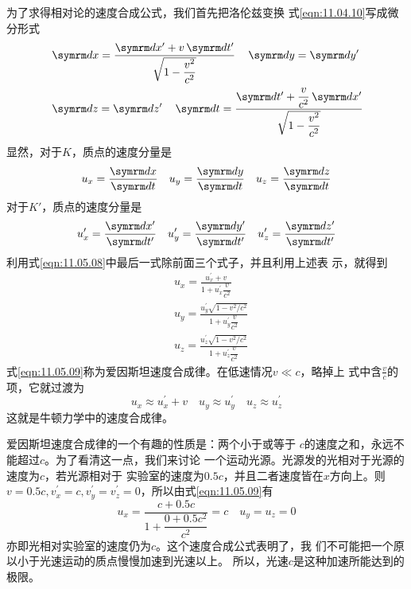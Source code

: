 为了求得相对论的速度合成公式，我们首先把洛伦兹变换
\lhbrak 式\eqref{eqn:11.04.10}\rhbrak 写成微分形式
\begin{equation}\label{eqn:11.05.08}
  \begin{aligned}
     & \dif x=\frac{ \dif x^{\prime}+v \dif t^{\prime}}{\sqrt{1-\dfrac{v^{2}}{c^{2}}}} \quad \dif y= \dif y^{\prime}                \\
     & \dif z= \dif z^{\prime} \quad \dif t=\frac{ \dif t^{\prime}+\dfrac{v}{c^{2}} \dif x^{\prime}}{\sqrt{1-\dfrac{v^{2}}{c^{2}}}}
  \end{aligned}
\end{equation}
显然，对于$ K $，质点的速度分量是
\begin{equation*}
  u _ { x } = \frac { \dif x } { \dif t }
  \quad
  u _ { y } = \frac { \dif y } { \dif t }
  \quad
  u _ { z } = \frac { \dif z } { \dif t }
\end{equation*}
对于$ K ' $，质点的速度分量是
\begin{equation*}
  u _ x ^ { \prime } = \frac { \dif x ^ { \prime } } { \dif t ^ { \prime } }
  \quad
  u _ y ^ { \prime } = \frac { \dif y ^ { \prime } } { \dif t ^ { \prime } }
  \quad
  u _ z ^ { \prime } = \frac { \dif z ^ { \prime } } { \dif t ^ { \prime } }
\end{equation*}
利用式\eqref{eqn:11.05.08}中最后一式除前面三个式子，并且利用上述表
示，就得到
\begin{equation}\label{eqn:11.05.09}
  \begin{aligned}
     & u_{x}=\frac{u_{x}^{\prime}+v}{1+u_{x}^{\prime} \dfrac{v}{c^{2}}}                      \\
     & u_{y}=\frac{u_{y}^{\prime} \sqrt{1-v^{2} / c^{2}}}{1+u_{y}^{\prime} \dfrac{v}{c^{2}}} \\
     & u_{z}=\frac{u_{z}^{\prime} \sqrt{1-v^{2} / c^{2}}}{1+u_{z}^{\prime} \dfrac{v}{c^{2}}}
  \end{aligned}
\end{equation}
式\eqref{eqn:11.05.09}称为爱因斯坦速度合成律。在低速情况$ v \ll c $，略掉上
式中含$ \frac { v } { c } $的项，它就过渡为
\begin{equation*}
  u _ { x } \approx u _ { x } ^ { \prime } + v
  \quad
  u _ { y } \approx u _ { y } ^ { \prime }
  \quad
  u _ { z } \approx u _ { z } ^ { \prime }
\end{equation*}
这就是牛顿力学中的速度合成律。

爱因斯坦速度合成律的一个有趣的性质是：两个小于或等于
$ c $的速度之和，永远不能超过$ c $。为了看清这一点，我们来讨论
一个运动光源。光源发的光相对于光源的速度为$ c $，若光源相对于
实验室的速度为$ 0.5c $，并且二者速度皆在$ x $方向上。则$ v = 0 . 5 c,
  v _ x ^ { \prime } = c, v _ { y } ^ { \prime } = v _ { z } ^ { \prime } = 0 $，所以由式\eqref{eqn:11.05.09}有
\begin{equation*}
  u _ { x } = \frac { c + 0 . 5 c } { 1 + \dfrac { 0 + 0 . 5 c ^ { 2 } } { c ^ { 2 } } } = c
  \quad
  u _ { y } = u _ { z } = 0
\end{equation*}
亦即光相对实验室的速度仍为$ c $。这个速度合成公式表明了，我
们不可能把一个原以小于光速运动的质点慢慢加速到光速以上。
所以，光速$ c $是这种加速所能达到的极限。


